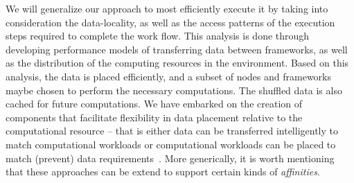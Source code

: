 \documentclass[3p,twocolumn]{elsarticle}
\begin{document}
We will generalize our approach to most efficiently execute it by
taking into consideration the data-locality, as well as the access
patterns of the execution steps required to complete the work flow.
This analysis is done through developing performance models of
transferring data between frameworks, as well as the distribution of
the computing resources in the environment. Based on this analysis,
the data is placed efficiently, and a subset of nodes and frameworks
maybe chosen to perform the necessary computations. The shuffled data
is also cached for future computations.  We have embarked on the
creation of components that facilitate flexibility in data placement
relative to the computational resource -- that is either data can be
transferred intelligently to match computational workloads or
computational workloads can be placed to match (prevent) data
requirements~\cite{???}. More generically, it is worth mentioning that
these approaches can be extend to support certain kinds of {\it
affinities}.





\end{document}
